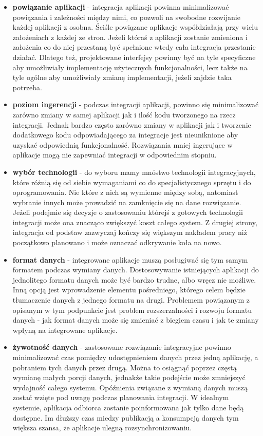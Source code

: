 \begin{itemize}
	\item \textbf{powiązanie aplikacji} - integracja aplikacji powinna minimalizować powiązania i zależności między nimi, co pozwoli na swobodne rozwijanie każdej aplikacji z osobna. Ściśle powiązane aplikacje współdziałają przy wielu założeniach z każdej ze stron. Jeżeli któraś z aplikacji zostanie zmieniona i założenia co do niej przestaną być spełnione wtedy cała integracja przestanie działać. Dlatego też, projektowane interfejsy powinny być na tyle specyficzne aby umożliwiały implementację użytecznych funkcjonalności, lecz także na tyle ogólne aby umożliwiały zmianę implementacji, jeżeli zajdzie taka potrzeba.
	\item \textbf{poziom ingerencji} - podczas integracji aplikacji, powinno się minimalizować zarówno zmiany w samej aplikacji jak i ilość kodu tworzonego na rzecz integracji. Jednak bardzo często zarówno zmiany w aplikacji jak i tworzenie dodatkowego kodu odpowiadającego za integracje jest nieuniknione aby uzyskać odpowiednią funkcjonalność. Rozwiązania mniej ingerujące w aplikacje mogą nie zapewniać integracji w odpowiednim stopniu.
	\item \textbf{wybór technologii} - do wyboru mamy mnóstwo technologii integracyjnych, które różnią się od siebie wymaganiami co do specjalistycznego sprzętu i do oprogramowania. Nie które z nich są wymienne między sobą, natomiast wybranie innych może prowadzić na zamknięcie się na dane rozwiązanie. Jeżeli podejmie się decyzje o zastosowaniu którejś z gotowych technologii integracji może ona znacząco zwiększyć koszt całego system. Z drugiej strony, integracja od podstaw zazwyczaj kończy się większym nakładem pracy niż początkowo planowano i może oznaczać odkrywanie koła na nowo.
	\item \textbf{format danych} - integrowane aplikacje muszą posługiwać się tym samym formatem podczas wymiany danych. Dostosowywanie istniejących aplikacji do jednolitego formatu danych może być bardzo trudne, albo wręcz nie możliwe. Inną opcją jest wprowadzenie elementu pośredniego, którego celem będzie tłumaczenie danych z jednego formatu na drugi. Problemem powiązanym z opisanym w tym podpunkcie jest problem rozszerzalności i rozwoju formatu danych - jak format danych może się zmieniać z biegiem czasu i jak te zmiany wpłyną na integrowane aplikacje.
	\item \textbf{żywotność danych} - zastosowane rozwiązanie integracyjne powinno minimalizować czas pomiędzy udostępnieniem danych przez jedną aplikację, a pobraniem tych danych przez drugą. Można to osiągnąć poprzez częstą wymianę małych porcji danych, jednakże takie podejście może zmniejszyć wydajność całego systemu. Opóźnienia związane z wymianą danych muszą zostać wzięte pod uwagę podczas planowania integracji. W idealnym systemie, aplikacja odbiorca zostanie poinformowana jak tylko dane będą dostępne. Im dłuższy czas miedzy publikacją a konsumpcją danych tym większa szansa, że aplikacje ulegną rozsynchronizowaniu.

\end{itemize}
